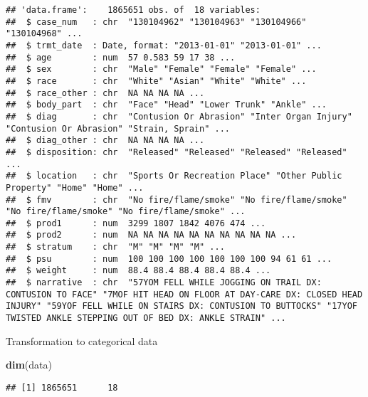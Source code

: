 \documentclass[]{article}
\newenvironment{Shaded}{\begin{snugshade}}{\end{snugshade}}
\newcommand{\CommentTok}[1]{\textcolor[rgb]{0.56,0.35,0.01}{\textit{#1}}}
\newcommand{\KeywordTok}[1]{\textcolor[rgb]{0.13,0.29,0.53}{\textbf{#1}}}
\newcommand{\NormalTok}[1]{#1}
\newcommand{\OperatorTok}[1]{\textcolor[rgb]{0.81,0.36,0.00}{\textbf{#1}}}
\newcommand{\StringTok}[1]{\textcolor[rgb]{0.31,0.60,0.02}{#1}}
\begin{document}
\begin{verbatim}
## 'data.frame':    1865651 obs. of  18 variables:
##  $ case_num   : chr  "130104962" "130104963" "130104966" "130104968" ...
##  $ trmt_date  : Date, format: "2013-01-01" "2013-01-01" ...
##  $ age        : num  57 0.583 59 17 38 ...
##  $ sex        : chr  "Male" "Female" "Female" "Female" ...
##  $ race       : chr  "White" "Asian" "White" "White" ...
##  $ race_other : chr  NA NA NA NA ...
##  $ body_part  : chr  "Face" "Head" "Lower Trunk" "Ankle" ...
##  $ diag       : chr  "Contusion Or Abrasion" "Inter Organ Injury" "Contusion Or Abrasion" "Strain, Sprain" ...
##  $ diag_other : chr  NA NA NA NA ...
##  $ disposition: chr  "Released" "Released" "Released" "Released" ...
##  $ location   : chr  "Sports Or Recreation Place" "Other Public Property" "Home" "Home" ...
##  $ fmv        : chr  "No fire/flame/smoke" "No fire/flame/smoke" "No fire/flame/smoke" "No fire/flame/smoke" ...
##  $ prod1      : num  3299 1807 1842 4076 474 ...
##  $ prod2      : num  NA NA NA NA NA NA NA NA NA NA ...
##  $ stratum    : chr  "M" "M" "M" "M" ...
##  $ psu        : num  100 100 100 100 100 100 100 94 61 61 ...
##  $ weight     : num  88.4 88.4 88.4 88.4 88.4 ...
##  $ narrative  : chr  "57YOM FELL WHILE JOGGING ON TRAIL DX: CONTUSION TO FACE" "7MOF HIT HEAD ON FLOOR AT DAY-CARE DX: CLOSED HEAD INJURY" "59YOF FELL WHILE ON STAIRS DX: CONTUSION TO BUTTOCKS" "17YOF TWISTED ANKLE STEPPING OUT OF BED DX: ANKLE STRAIN" ...
\end{verbatim}

Transformation to categorical data

\begin{Shaded}
\begin{Highlighting}[]
\KeywordTok{dim}\NormalTok{(data)}
\end{Highlighting}
\end{Shaded}

\begin{verbatim}
## [1] 1865651      18
\end{verbatim}

\begin{Shaded}
\end{Shaded}
\end{document}
